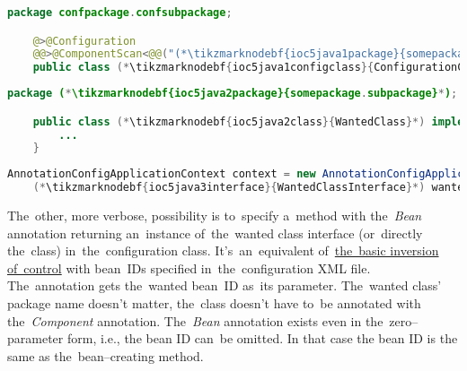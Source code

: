 \begin{lstlisting}[language=Java, title={Configuration class}]
    package confpackage.confsubpackage;

    @>@Configuration
    @@>@ComponentScan<@@("(*\tikzmarknodebf{ioc5java1package}{somepackage.subpackage}[ForestGreen]*)")
    public class (*\tikzmarknodebf{ioc5java1configclass}{ConfigurationClass}*) {}
\end{lstlisting}
\begin{lstlisting}[language=Java, title={Wanted class}]
    package (*\tikzmarknodebf{ioc5java2package}{somepackage.subpackage}*);

    public class (*\tikzmarknodebf{ioc5java2class}{WantedClass}*) implements (*\tikzmarknodebf{ioc5java2interface}{WantedClassInterface}*) {
        ...
    }
\end{lstlisting}
\begin{lstlisting}[language=Java, title={Usage}]
    AnnotationConfigApplicationContext context = new AnnotationConfigApplicationContext((*\tikzmarknodebf{ioc5java3configclass}{ConfigurationClass}*).class);
    (*\tikzmarknodebf{ioc5java3interface}{WantedClassInterface}*) wantedClassInstance = context.getBean("(*\tikzmarknodebf{ioc5java3beanid}{wantedClass}[ForestGreen]*)", (*\tikzmarknodebf{ioc5java3interface2}{WantedClassInterface}*).class);
\end{lstlisting}

\noindent The~other, more verbose, possibility is to~specify a~method with the~\textit{Bean} annotation returning an~instance of~the~wanted class interface (or~directly the~class) in~the~configuration class.
It's~an~equivalent of~\hyperref[springinversionofcontrol]{the~basic inversion of~control} with bean~IDs specified in~the~configuration XML file.
The~annotation gets the~wanted bean~ID as~its parameter.
The~wanted class' package name doesn't matter, the~class doesn't have to~be annotated with the~\textit{Component} annotation.
The~\textit{Bean} annotation exists even in the~zero--parameter form, i.e., the bean ID can~be omitted.
In that case the bean ID is the same as the~bean--creating method.
\newpage

